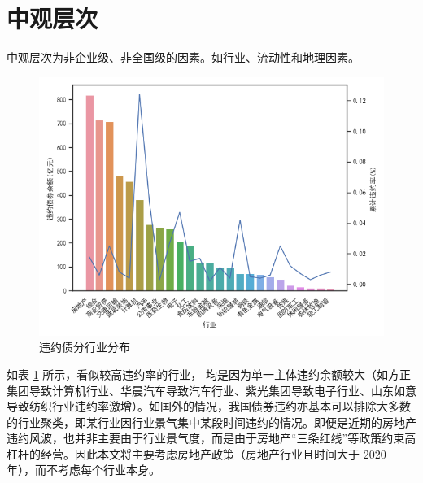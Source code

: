 \section{中观层次}
中观层次为非企业级、非全国级的因素。如行业、流动性和地理因素。

\begin{figure}[h]
	\centering
	\includegraphics[width=.9\linewidth]{./data/industry.png}
	\caption{\label{fig:industry}违约债分行业分布}
\end{figure}

如表 \ref{fig:industry} 所示，看似较高违约率的行业，
均是因为单一主体违约余额较大（如方正集团导致计算机行业、华晨汽车导致汽车行业、紫光集团导致电子行业、山东如意导致纺织行业违约率激增）。如国外的情况\cite{azizpour2018exploring}，我国债券违约亦基本可以排除大多数的行业聚类，即某行业因行业景气集中某段时间违约的情况。即便是近期的房地产违约风波，也并非主要由于行业景气度，而是由于房地产“三条红线”等政策约束高杠杆的经营。因此本文将主要考虑房地产政策（房地产行业且时间大于 2020 年），而不考虑每个行业本身。

